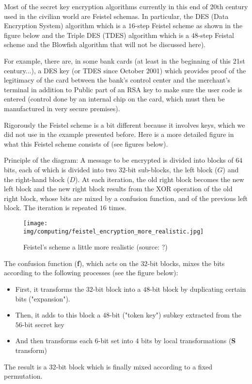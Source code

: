 	Most of the secret key encryption algorithms currently in this end of 20th century used in the civilian world are Feistel schemas. In particular, the DES (Data Encryption System) algorithm  which is a $16$-step Feistel scheme as shown in the figure below and the Triple DES (TDES) algorithm which is a $48$-step Feistal scheme and the Blowfish algorithm that will not be discussed here).
	
	\begin{tcolorbox}[title=Remark,colframe=black,arc=10pt]
	For example, there are, in some bank cards (at least in the beginning of this 21st century...), a DES key (or TDES since October 2001) which provides proof of the legitimacy of the card between the bank's control center and the merchant's terminal in addition to Public part of an RSA key to make sure the user code is entered (control done by an internal chip on the card, which must then be manufactured in very secure premises).
	\end{tcolorbox}
	Rigorously the Feistel scheme is a bit different because it involves keys, which we did not use in the example presented before. Here is a more detailed figure in what this Feistel scheme consists of (see figures below).

	Principle of the diagram: A message to be encrypted is divided into blocks of $64$ bits, each of which is divided into two $32$-bit sub-blocks, the left block ($G$) and the right-hand block ($D$). At each iteration, the old right block becomes the new left block and the new right block results from the XOR operation of the old right block, whose bits are mixed by a confusion function, and of the previous left block. The iteration is repeated $16$ times.
	\begin{figure}[H]
		\centering
		\texttt{[image: img/computing/feistel\_encryption\_more\_realistic.jpg]}
		\caption{Feistel's scheme a little more realistic (source: ?)}
	\end{figure}
	The confusion function (\textbf{f}), which acts on the $32$-bit blocks, mixes the bits according to the following processes (see the figure below):
	\begin{itemize}
		\item First, it transforms the $32$-bit block into a $48$-bit block by duplicating certain bits ("expansion"). 

		\item Then, it adds to this block a $48$-bit ("token key") subkey extracted from the $56$-bit secret key 

		\item And then transforms each $6$-bit set into $4$ bits by local transformations (\textbf{S} transform)
	\end{itemize}
	The result is a $32$-bit block which is finally mixed according to a fixed permutation.
	
